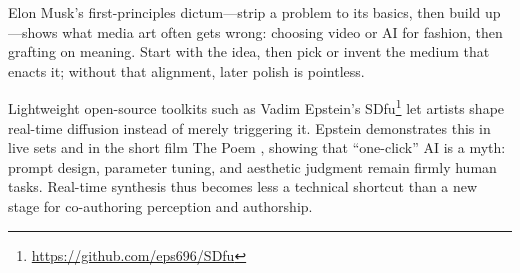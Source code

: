 \documentclass[sigconf,nonacm]{acmart}
\begin{document}
Elon Musk’s first-principles dictum—strip a problem to its basics, then build up \cite{Brier2014}—shows what media art often gets wrong: choosing video or AI for fashion, then grafting on meaning. Start with the idea, then pick or invent the medium that enacts it; without that alignment, later polish is pointless.

Lightweight open-source toolkits such as Vadim Epstein’s SDfu\footnote{\url{https://github.com/eps696/SDfu}} let artists shape real-time diffusion instead of merely triggering it. Epstein demonstrates this in live sets and in the short film The Poem \cite{epstein_wesual_2025,epstein_poem_2025}, showing that “one-click” AI is a myth: prompt design, parameter tuning, and aesthetic judgment remain firmly human tasks. Real-time synthesis thus becomes less a technical shortcut than a new stage for co-authoring perception and authorship.
\end{document}
